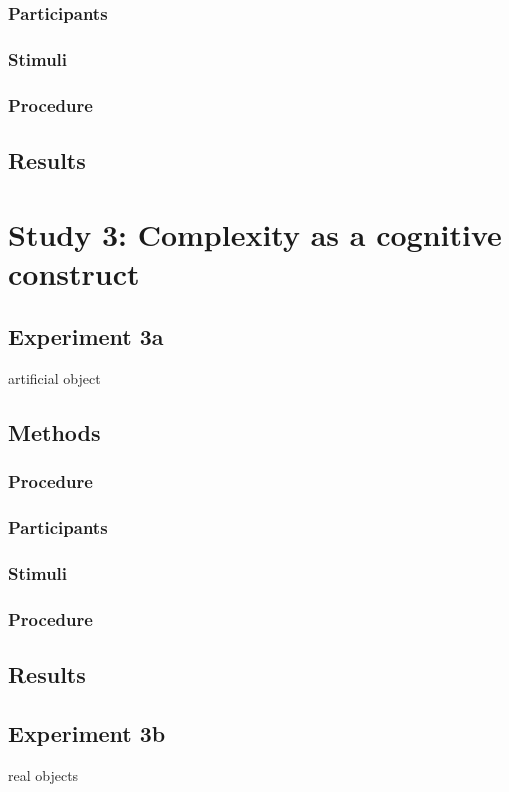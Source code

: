 \documentclass[man]{apa2}
\begin{document}
\subsubsection{Participants}
\subsubsection{Stimuli}
\subsubsection{Procedure}
\subsection{Results}






\section{Study 3: Complexity as a cognitive construct}

\subsection{\textbf{Experiment 3a}}
artificial object
\subsection{Methods}
\subsubsection{Procedure}
\subsubsection{Participants}
\subsubsection{Stimuli}
\subsubsection{Procedure}
\subsection{Results}

\subsection{\textbf{Experiment 3b}}
real objects
\end{document}
